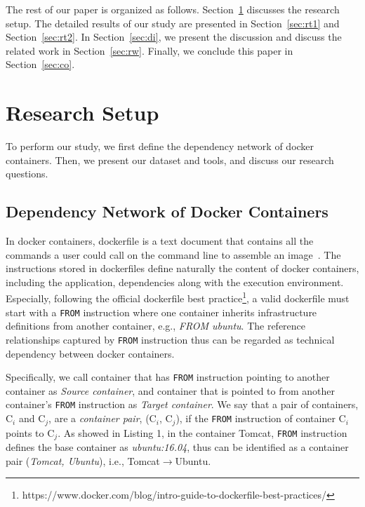 \documentclass[sigconf]{acmart}
\begin{document}
The rest of our paper is organized as follows. Section~\ref{sec:rs} discusses the research setup. The detailed results of our study are presented in Section~\ref{sec:rt1} and Section~\ref{sec:rt2}. In Section~\ref{sec:di}, we present the discussion and discuss the related work in Section~\ref{sec:rw}. Finally, we conclude this paper in Section~\ref{sec:co}. 






\section{Research Setup}
\label{sec:rs}
To perform our study, we first define the dependency network of docker containers. Then, we present our dataset and tools, and discuss our research questions.

\subsection{Dependency Network of Docker Containers}
\label{subsec:cdn}
In docker containers, dockerfile is a text document that contains all
the commands a user could call on the command line to assemble an image~\cite{zhang2019clustering}. 
The instructions stored in dockerfiles define naturally the 
content of docker containers, including the application, 
dependencies along with the execution environment. 
Especially, following the official dockerfile best 
practice\footnote{ https://www.docker.com/blog/intro-guide-to-dockerfile-best-practices/}, 
a valid dockerfile must start with a \texttt{FROM} instruction where one container inherits 
infrastructure definitions from another container, e.g., \emph{FROM ubuntu}. The reference relationships 
captured by \texttt{FROM} instruction thus can be regarded as technical dependency between docker containers. 


Specifically, we call container that has \texttt{FROM} instruction pointing to another container as \emph{Source container}, and container that is pointed to from another container's \texttt{FROM} instruction as \emph{Target container}. We say that a pair of containers, C$_i$ and C$_j$, are a \emph{container pair}, (C$_i$, C$_j$), if the \texttt{FROM} instruction of container C$_i$ points to C$_j$. As showed in Listing 1, in the container Tomcat, \texttt{FROM} instruction defines the base container as \emph{ubuntu:16.04}, thus can be identified as a container pair (\emph{Tomcat, Ubuntu}), i.e., Tomcat$\rightarrow$Ubuntu.
\end{document}
